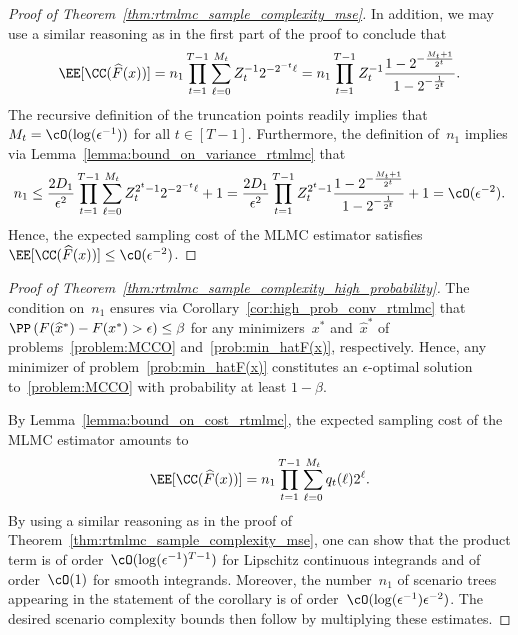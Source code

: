 \documentclass[11pt]{article}
\let\hat\widehat
\begin{document}
\begin{proof}[Proof of Theorem~\ref{thm:rtmlmc_sample_complexity_mse}]
In addition, we may use a similar reasoning as in the first part of the proof to conclude that
\begin{align*}
    \EE[\CC(\hat{F}(x))] = n_1 \prod_{t=1}^{T-1} \sum_{\ell=0}^{M_t}Z_t^{-1} 2^{-2^{-t}\ell} = n_1 \prod_{t=1}^{T-1} Z_t^{-1}\frac{1-2^{-\frac{M_{t}+1}{2^{t}}}}{1-2^{-\frac{1}{2^t}}}. 
\end{align*}
The recursive definition of the truncation points readily implies that~$M_t = \cO(\log(\epsilon^{-1}))$ for all $t \in [T-1]$. Furthermore, the definition of~$n_1$ implies via Lemma~\ref{lemma:bound_on_variance_rtmlmc} that
\begin{align*}
    n_1 \leq \frac{2D_1}{\epsilon^2}\prod_{t=1}^{T-1} \sum_{\ell=0}^{M_t} Z_t^{2^t-1}2^{-2^{-t}\ell}+1
    =\frac{2D_1}{\epsilon^2}\prod_{t=1}^{T-1}Z_t^{2^t-1}\frac{1-2^{-\frac{M_t+1}{2^t}}}{1-2^{-\frac{1}{2^t}}} + 1=\cO(\epsilon^{-2}).
\end{align*}
Hence, the expected sampling cost of the MLMC estimator satisfies $\EE[\CC(\hat{F}(x))] \leq \cO(\epsilon^{-2})$.
\end{proof}
\begin{proof}[Proof of Theorem~\ref{thm:rtmlmc_sample_complexity_high_probability}] 
    The condition on~$n_1$ ensures via Corollary~\ref{cor:high_prob_conv_rtmlmc} that $ \PP\left( F(\hat{x}^*) - F(x^*)  > \epsilon \right) \leq \beta$ for any minimizers~$x^*$ and~$\hat{x}^*$ of problems~\eqref{problem:MCCO} and~\eqref{prob:min_hatF(x)}, respectively. Hence, any minimizer of problem~\eqref{prob:min_hatF(x)} constitutes an $\epsilon$-optimal solution to~\eqref{problem:MCCO} with probability at least $1-\beta$. 
    
    By Lemma~\ref{lemma:bound_on_cost_rtmlmc}, the expected sampling cost of the MLMC estimator amounts to
    \[
        \EE[\CC(\hat{F}(x))] = n_1 \prod_{t=1}^{T-1} \sum_{\ell=0}^{M_t} q_t(\ell)2^{\ell}.
    \] 
    By using a similar reasoning as in the proof of Theorem~\ref{thm:rtmlmc_sample_complexity_mse}, one can show that the product term is of order~$\cO(\log(\epsilon^{-1})^{T-1})$ for Lipschitz continuous integrands and of order~$\cO(1)$ for smooth integrands. Moreover, the number~$n_1$ of scenario trees appearing in the statement of the corollary is of order~$\cO(\log(\epsilon^{-1})\epsilon^{-2})$. The desired scenario complexity bounds then follow by multiplying these estimates. 
\end{proof}
\end{document}
